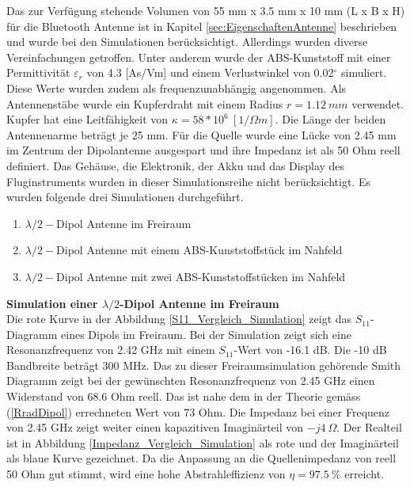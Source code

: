 Das zur Verfügung stehende Volumen von 55 mm x 3.5 mm x 10 mm (L x B x H) für die Bluetooth Antenne ist in Kapitel \ref{sec:EigenschaftenAntenne} beschrieben und wurde bei den Simulationen berücksichtigt. Allerdings wurden diverse Vereinfachungen getroffen. Unter anderem wurde der ABS-Kunststoff mit einer Permittivität $\varepsilon_r $ von 4.3 [As/Vm] und einem Verlustwinkel von 0.02$^\circ$ simuliert. Diese Werte wurden zudem als frequenzunabhängig angenommen. Als Antennenstäbe wurde ein Kupferdraht mit einem Radius $r = 1.12\ mm$ verwendet. Kupfer hat eine Leitfähigkeit von $\kappa=58*10^{6}\ [1/\Omega m]$. Die Länge der beiden Antennenarme beträgt je 25 mm. Für die Quelle wurde eine Lücke von 2.45 mm im Zentrum der Dipolantenne ausgespart und ihre Impedanz ist als 50 Ohm reell definiert. Das Gehäuse, die Elektronik, der Akku und das Display des Fluginstruments wurden in dieser Simulationsreihe nicht berücksichtigt. Es wurden folgende drei Simulationen durchgeführt.
\begin{enumerate}
\item $\lambda/2-$Dipol Antenne im Freiraum
\item $\lambda/2-$Dipol Antenne mit einem ABS-Kunststoffstück im Nahfeld
\item $\lambda/2-$Dipol Antenne mit zwei ABS-Kunststoffstücken im Nahfeld
\end{enumerate}

\textbf{Simulation einer $\lambda/2$-Dipol Antenne im Freiraum}\\
Die rote Kurve in der Abbildung \ref{S11_Vergleich_Simulation} zeigt das $S_{11}$-Diagramm eines Dipols im Freiraum. Bei der Simulation zeigt sich eine Resonanzfrequenz von 2.42 GHz mit einem $S_{11}$-Wert von -16.1 dB. Die -10 dB Bandbreite beträgt 300 MHz. Das zu dieser Freiraumsimulation gehörende Smith Diagramm zeigt bei der gewünschten Resonanzfrequenz von 2.45 GHz einen Widerstand von 68.6 Ohm reell. Das ist nahe dem in der Theorie gemäss (\ref{RradDipol}) errechneten Wert von 73 Ohm. Die Impedanz bei einer Frequenz von 2.45 GHz zeigt weiter einen kapazitiven Imaginärteil von $-j4\ \Omega$. Der Realteil ist in Abbildung \ref{Impedanz_Vergleich_Simulation} als rote und der Imaginärteil als blaue Kurve gezeichnet. Da die Anpassung an die Quellenimpedanz von reell 50 Ohm gut stimmt, wird eine hohe Abstrahleffizienz von $\eta = 97.5 \ \% $ erreicht.\\



